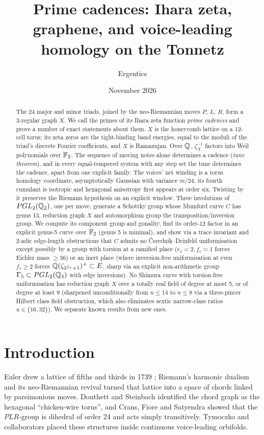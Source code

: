 \documentclass[11pt]{amsart}
\title[Prime cadences]{Prime cadences: Ihara zeta, graphene, and voice-leading homology on the Tonnetz}
\author{Ergentics}
\date{November 2026}
\numberwithin{equation}{section}
\theoremstyle{plain}
\theoremstyle{definition}\newtheorem{definition}[theorem]{Definition}
\theoremstyle{remark}\newtheorem{remark}[theorem]{Remark}
\begin{document}
\begin{abstract}
The 24 major and minor triads, joined by the neo-Riemannian moves $P$, $L$, $R$, form a 3-regular graph $X$. We call the primes of its Ihara zeta function \emph{prime cadences} and prove a number of exact statements about them. $X$ is the honeycomb lattice on a 12-cell torus; its zeta zeros are the tight-binding band energies, equal to the moduli of the triad's discrete Fourier coefficients, and $X$ is Ramanujan. Over $\mathbb{Q}$, $\zeta_X^{-1}$ factors into Weil polynomials over $\mathbb{F}_2$. The sequence of moving notes alone determines a cadence (\emph{tune theorem}), and in every equal-tempered system with any step set the tune determines the cadence, apart from one explicit family. The voices' net winding is a torus homology coordinate, asymptotically Gaussian with variance $m/24$; its fourth cumulant is isotropic and hexagonal anisotropy first appears at order six. Twisting by it preserves the Riemann hypothesis on an explicit window. Three involutions of $PGL_2(\mathbb{Q}_2)$, one per move, generate a Schottky group whose Mumford curve $C$ has genus 13, reduction graph $X$ and automorphism group the transposition/inversion group. We compute its component group and gonality, find its order-12 factor in an explicit genus-5 curve over $\mathbb{F}_2$ (genus 5 is minimal), and show via a trace invariant and 2-adic edge-length obstructions that $C$ admits no \v{C}erednik--Drinfeld uniformisation except possibly by a group with torsion at a ramified place ($e_v=2,f_v=1$ forces Eichler mass $\ge 36$) or an inert place (where inversion-free uniformisation at even $f_v\ge2$ forces $\mathbb{Q}(\zeta_{2^{f_v}+1})^+\subset E$, sharp via an explicit non-arithmetic group $\Gamma_5\subset PGL_2(\mathbb{Q}_4)$ with edge inversions). No Shimura curve with torsion-free uniformisation has reduction graph $X$ over a totally real field of degree at most 5, or of degree at least 9 (sharpened unconditionally from $n\le14$ to $n\le8$ via a three-pincer Hilbert class field obstruction, which also eliminates sextic narrow-class ratios $u\in\{16,32\}$). We separate known results from new ones.
\end{abstract}
\maketitle


\section{Introduction}
Euler drew a lattice of fifths and thirds in 1739 \cite{euler}; Riemann's harmonic dualism and its neo-Riemannian revival \cite{lewin,cohn96,cohn97,cohn12} turned that lattice into a space of chords linked by parsimonious moves. Douthett and Steinbach \cite{ds98} identified the chord graph as the hexagonal ``chicken-wire torus'', and Crans, Fiore and Satyendra \cite{cfs09} showed that the $PLR$-group is dihedral of order 24 and acts simply transitively. Tymoczko and collaborators \cite{tym06,cqt08,tym12} placed these structures inside continuous voice-leading orbifolds.
\end{document}
